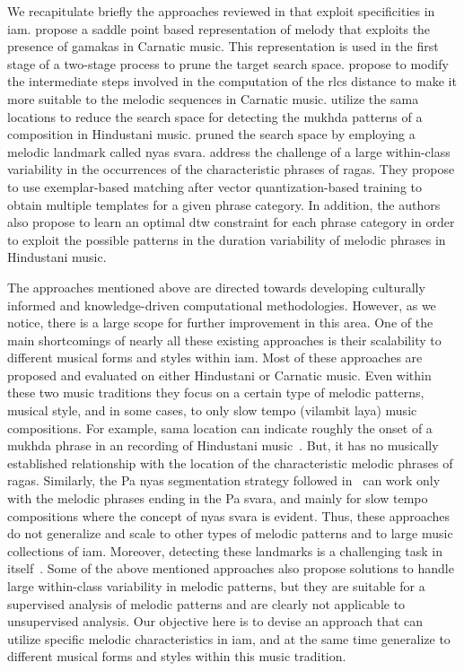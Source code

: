 We recapitulate briefly the approaches reviewed in  that exploit specificities in \gls{iam}.  \cite{Ishwar2013} propose a saddle point based representation of melody that exploits the presence of \glspl{gamaka} in Carnatic music. This representation is used in the first stage of a two-stage process to prune the target search space. \cite{dutta2014modified} propose to modify the intermediate steps involved in the computation of the \gls{rlcs} distance to make it more suitable to the melodic sequences in Carnatic music.  \cite{Ross2012b} utilize the \gls{sama} locations to reduce the search space for detecting the \gls{mukhda} patterns of a composition in Hindustani music. \cite{Ross2012} pruned the search space by employing a melodic landmark called \gls{nyas} \gls{svara}. \cite{Rao2014} address the challenge of a large within-class variability in the occurrences of the characteristic phrases of \glspl{raga}. They propose to use exemplar-based matching after vector quantization-based training to obtain multiple templates for a given phrase category. In addition, the authors also propose to learn an optimal \gls{dtw} constraint for each phrase category in order to exploit the possible patterns in the duration variability of melodic phrases in Hindustani music. 

The approaches mentioned above are directed towards developing culturally informed and knowledge-driven computational methodologies. However, as we notice, there is a large scope for further improvement in this area. One of the main shortcomings of nearly all these existing approaches is their scalability to different musical forms and styles within \gls{iam}. Most of these approaches are proposed and evaluated on either Hindustani or Carnatic music. Even within these two music traditions they focus on a certain type of melodic patterns, musical style, and in some cases, to only slow tempo (vilambit laya) music compositions. For example, \gls{sama} location can indicate roughly the onset of a \gls{mukhda} phrase in an recording of Hindustani music~\citep{Ross2012b}. But, it has no musically established relationship with the location of the characteristic melodic phrases of \glspl{raga}. Similarly, the Pa \gls{nyas} segmentation strategy followed in~\cite{Ross2012} can work only with the melodic phrases ending in the Pa \gls{svara}, and mainly for slow tempo compositions where the concept of \gls{nyas} \gls{svara} is evident. Thus, these approaches do not generalize and scale to other types of melodic patterns and to large music collections of \gls{iam}. Moreover, detecting these landmarks is a challenging task in itself~\citep{srinivasamurthy2014supervised,gulati2014Landmark}. Some of the above mentioned approaches also propose solutions to handle large within-class variability in melodic patterns, but they are suitable for a supervised analysis of melodic patterns and are clearly not applicable to unsupervised analysis. Our objective here is to devise an approach that can utilize specific melodic characteristics in \gls{iam}, and at the same time generalize to different musical forms and styles within this music tradition.

